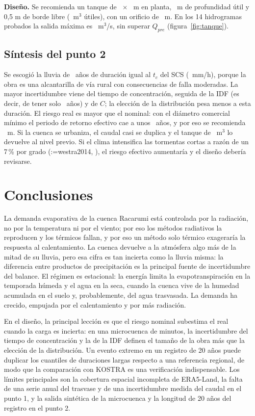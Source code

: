 \documentclass[12pt,a4paper]{article}
\makeatletter
\newcommand{\parencite}[2][]{(\@tempswafalse\@for\rk:=#2\do{\if@tempswa; \fi\@tempswatrue\csname rA@\rk\endcsname, \csname rY@\rk\endcsname}\ifx\relax#1\relax\else, #1\fi)}
\makeatother
\begin{document}
\textbf{Diseño.} Se recomienda un tanque de \LadoTanque\ $\times$ \LadoTanque\ m en planta, \Hutil\ m de profundidad útil y 0,5 m de borde libre (\VolUtil\ m$^3$ útiles), con un orificio de \DOrif\ m. En los 14 hidrogramas probados la salida máxima es \QsalMax\ m$^3$/s, sin superar $Q_{pre}$ (figura~\ref{fig:tanque}).

\subsection{Síntesis del punto 2}

Se escogió la lluvia de \Tdis\ años de duración igual al $t_c$ del SCS (\Idis\ mm/h), porque la obra es una alcantarilla de vía rural con consecuencias de falla moderadas. La mayor incertidumbre viene del tiempo de concentración, seguida de la IDF (es decir, de tener solo \NAnios\ años) y de $C$; la elección de la distribución pesa menos a esta duración. El riesgo real es mayor que el nominal: con el diámetro comercial mínimo el periodo de retorno efectivo cae a unos \Teff\ años, y por eso se recomienda \Drec\ m. Si la cuenca se urbaniza, el caudal casi se duplica y el tanque de \VolUtil\ m$^3$ lo devuelve al nivel previo. Si el clima intensifica las tormentas cortas a razón de un 7\,\% por grado \parencite{westra2014}, el riesgo efectivo aumentaría y el diseño debería revisarse.

\section{Conclusiones}

La demanda evaporativa de la cuenca Racarumi está controlada por la radiación, no por la temperatura ni por el viento; por eso los métodos radiativos la reproducen y los térmicos fallan, y por eso un método solo térmico exageraría la respuesta al calentamiento. La cuenca devuelve a la atmósfera algo más de la mitad de su lluvia, pero esa cifra es tan incierta como la lluvia misma: la diferencia entre productos de precipitación es la principal fuente de incertidumbre del balance. El régimen es estacional: la energía limita la evapotranspiración en la temporada húmeda y el agua en la seca, cuando la cuenca vive de la humedad acumulada en el suelo y, probablemente, del agua trasvasada. La demanda ha crecido, empujada por el calentamiento y por más radiación.

En el diseño, la principal lección es que el riesgo nominal subestima el real cuando la carga es incierta: en una microcuenca de minutos, la incertidumbre del tiempo de concentración y la de la IDF definen el tamaño de la obra más que la elección de la distribución. Un evento extremo en un registro de 20 años puede duplicar los cuantiles de duraciones largas respecto a una referencia regional, de modo que la comparación con KOSTRA es una verificación indispensable. Los límites principales son la cobertura espacial incompleta de ERA5-Land, la falta de una serie anual del trasvase y de una incertidumbre medida del caudal en el punto 1, y la salida sintética de la microcuenca y la longitud de 20 años del registro en el punto 2.
\end{document}
